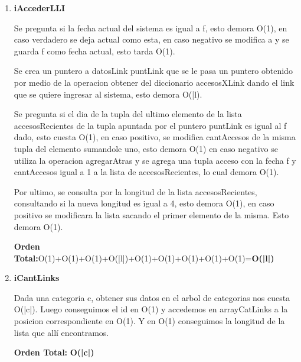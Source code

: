\begin{enumerate}
\item\textbf{iAccederLLI}
\par Se pregunta si la fecha actual del sistema es igual a f, esto demora O(1), en caso verdadero se deja actual como esta, en caso negativo se modifica a y se guarda f como fecha actual, esto tarda O(1).
\par Se crea un puntero a datosLink puntLink que se le pasa un puntero obtenido por medio de la operacion obtener del diccionario accesosXLink dando el link que se quiere ingresar al sistema, esto demora O(|l). 
\par Se pregunta si el dia de la tupla del ultimo elemento de la lista accesosRecientes de la tupla apuntada por el puntero puntLink es igual al f dado, esto cuesta O(1), en caso positivo, se modifica cantAccesos de la misma tupla del elemento sumandole uno, esto demora O(1) en caso negativo se utiliza la operacion agregarAtras y se agrega una tupla acceso con la fecha f y cantAccesos igual a 1 a la lista de accesosRecientes, lo cual demora O(1).
\par Por ultimo, se consulta por la longitud de la lista accesosRecientes, consultando si la nueva longitud es igual a 4, esto demora O(1), en caso positivo se modificara la lista sacando el primer elemento de la misma. Esto demora O(1).
\par\textbf{Orden Total:}O(1)+O(1)+O(1)+O(|l|)+O(1)+O(1)+O(1)+O(1)+O(1)=\textbf{O(|l|)}

\item\textbf{iCantLinks}
\par Dada una categoria c, obtener sus datos en el arbol de categorias nos cuesta O(|c|). Luego conseguimos el id en O(1) y accedemos en arrayCatLinks a la posicion correspondiente en O(1). Y en O(1) conseguimos la longitud de la lista que allí encontramos.
\par\textbf{Orden Total:} \textbf{O(|c|)}


\end{enumerate}
